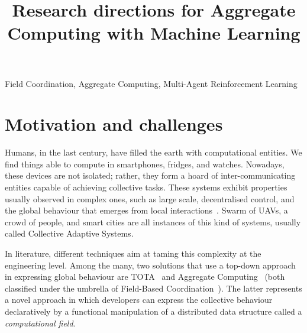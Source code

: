 \documentclass[conference]{IEEEtran}
\begin{document}
\title{Research directions for Aggregate Computing with Machine Learning}

\author{
\and
{}
}

\maketitle

\begin{IEEEkeywords}
Field Coordination, Aggregate Computing, Multi-Agent Reinforcement Learning
\end{IEEEkeywords}

\section{Motivation and challenges}
Humans, in the last century, have filled the earth with computational entities. 
%
We find things able to compute in smartphones, fridges, and watches. %
Nowadays, these devices are not isolated; rather, they form a hoard of inter-communicating entities capable of achieving collective tasks. 
These systems exhibit properties usually observed in complex ones, such as large scale, 
decentralised control, and the global behaviour that emerges from local interactions~\cite{DBLP:conf/huc/Ferscha15}. 
Swarm of UAVs, a crowd of people, and smart cities are all instances of this kind of systems, usually called Collective Adaptive Systems.

In literature, different techniques aim at taming this complexity at the engineering level.
Among the many, two solutions that use a top-down approach in expressing global behaviour are TOTA~\cite{DBLP:journals/tosem/MameiZ09} and Aggregate Computing~\cite{DBLP:journals/computer/BealPV15} (both classified under the umbrella of Field-Based Coordination~\cite{DBLP:books/daglib/0015276}).
The latter represents a novel approach in which developers can express the collective behaviour declaratively by
a functional manipulation of a distributed data structure called a \emph{computational field}.
\end{document}
